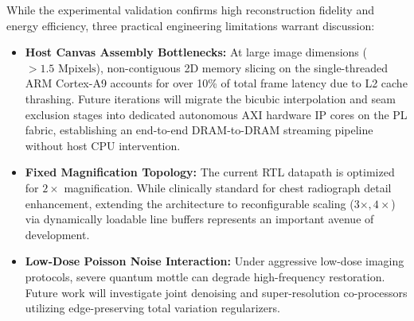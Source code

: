 \documentclass[conference]{IEEEtran}
\begin{document}
While the experimental validation confirms high reconstruction fidelity and energy efficiency, three practical engineering limitations warrant discussion:
\begin{itemize}
    \item \textbf{Host Canvas Assembly Bottlenecks:} At large image dimensions ($> 1.5\text{ Mpixels}$), non-contiguous 2D memory slicing on the single-threaded ARM Cortex-A9 accounts for over 10\% of total frame latency due to L2 cache thrashing. Future iterations will migrate the bicubic interpolation and seam exclusion stages into dedicated autonomous AXI hardware IP cores on the PL fabric, establishing an end-to-end DRAM-to-DRAM streaming pipeline without host CPU intervention.
    \item \textbf{Fixed Magnification Topology:} The current RTL datapath is optimized for $2\times$ magnification. While clinically standard for chest radiograph detail enhancement, extending the architecture to reconfigurable scaling ($3\times, 4\times$) via dynamically loadable line buffers represents an important avenue of development.
    \item \textbf{Low-Dose Poisson Noise Interaction:} Under aggressive low-dose imaging protocols, severe quantum mottle can degrade high-frequency restoration. Future work will investigate joint denoising and super-resolution co-processors utilizing edge-preserving total variation regularizers.
\end{itemize}



\end{document}
